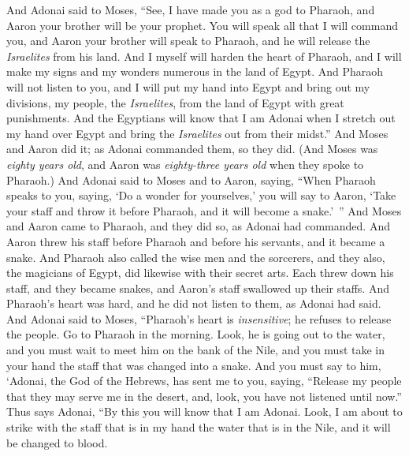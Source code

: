 \begin{biblechapter} %
 And Adonai said to Moses, “See, I have made you as a god to Pharaoh, and Aaron your brother will be your prophet.
\verse You will speak all that I will command you, and Aaron your brother will speak to Pharaoh, and he will release the \textit{Israelites} from his land.
\verse And I myself will harden the heart of Pharaoh, and I will make my signs and my wonders numerous in the land of Egypt.
\verse And Pharaoh will not listen to you, and I will put my hand into Egypt and bring out my divisions, my people, the \textit{Israelites}, from the land of Egypt with great punishments.
\verse And the Egyptians will know that I am Adonai when I stretch out my hand over Egypt and bring the \textit{Israelites} out from their midst.”
\verse And Moses and Aaron did it; as Adonai commanded them, so they did.
\verse (And Moses was \textit{eighty years old}, and Aaron was \textit{eighty-three years old} when they spoke to Pharaoh.)
 And Adonai said to Moses and to Aaron, saying,
\verse “When Pharaoh speaks to you, saying, ‘Do a wonder for yourselves,’ you will say to Aaron, ‘Take your staff and throw it before Pharaoh, and it will become a snake.’ ”
\verse And Moses and Aaron came to Pharaoh, and they did so, as Adonai had commanded. And Aaron threw his staff before Pharaoh and before his servants, and it became a snake.
\verse And Pharaoh also called the wise men and the sorcerers, and they also, the magicians of Egypt, did likewise with their secret arts.
\verse Each threw down his staff, and they became snakes, and Aaron’s staff swallowed up their staffs.
\verse And Pharaoh’s heart was hard, and he did not listen to them, as Adonai had said.
 And Adonai said to Moses, “Pharaoh’s heart is \textit{insensitive}; he refuses to release the people.
\verse Go to Pharaoh in the morning. Look, he is going out to the water, and you must wait to meet him on the bank of the Nile, and you must take in your hand the staff that was changed into a snake.
\verse And you must say to him, ‘Adonai, the God of the Hebrews, has sent me to you, saying, “Release my people that they may serve me in the desert, and, look, you have not listened until now.”
\verse Thus says Adonai, “By this you will know that I am Adonai. Look, I am about to strike with the staff that is in my hand the water that is in the Nile, and it will be changed to blood.

\end{biblechapter}
